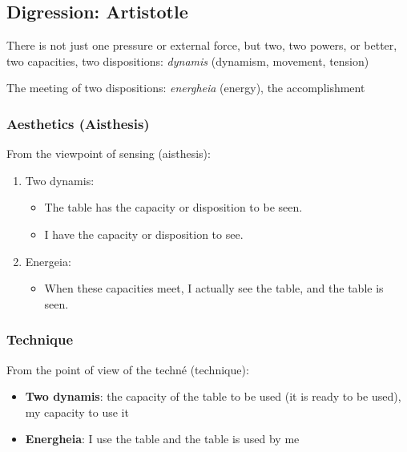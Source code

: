     \subsection*{Digression: Artistotle}

        \begin{remark}
            There is not just one pressure or external force, but two, two powers, or better, two capacities, two dispositions: \textit{dynamis} (dynamism, movement, tension)

            The meeting of two dispositions: \textit{energheia} (energy), the accomplishment
        \end{remark}

        \subsubsection{Aesthetics (Aisthesis)}

            From the viewpoint of sensing (aisthesis):

            \begin{enumerate}
                \item Two dynamis:
                    \begin{itemize}
                        \item The table has the capacity or disposition to be seen.
                        \item I have the capacity or disposition to see.
                    \end{itemize}
                \item Energeia:
                    \begin{itemize}
                        \item When these capacities meet, I actually see the table, and the table is seen.
                    \end{itemize}
            \end{enumerate}

        \subsubsection{Technique}

            From the point of view of the techné (technique): 

            \begin{itemize}
                \item \textbf{Two dynamis}: the capacity of the table to be used (it is ready to be used), my capacity to use it
                \item \textbf{Energheia}: I use the table and the table is used by me
            \end{itemize}

